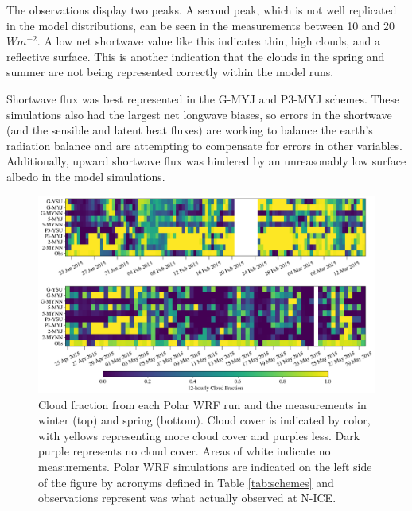 The observations display two peaks. A second peak, which is not well replicated in the model distributions, can be seen in the measurements between 10 and 20 $Wm^{-2}$. A low net shortwave value like this indicates thin, high clouds, and a reflective surface. This is another indication that the clouds in the spring and summer are not being represented correctly within the model runs. 

Shortwave flux was best represented in the G-MYJ and P3-MYJ schemes. These simulations also had the largest net longwave biases, so errors in the shortwave (and the sensible and latent heat fluxes) are working to balance the earth's radiation balance and are attempting to compensate for errors in other variables. Additionally, upward shortwave flux was hindered by an unreasonably low surface albedo in the model simulations.

\begin{figure}[h!]
    \centering \hspace*{-0.5cm}
    \includegraphics[width=1.1\linewidth]{figures/chapter3/WRF_Clouds.png}
    \caption[Polar WRF simulated cloud fraction.]{Cloud fraction from each Polar WRF run and the measurements in winter (top) and spring (bottom). Cloud cover is indicated by color, with yellows representing more cloud cover and purples less. Dark purple represents no cloud cover. Areas of white indicate no measurements. Polar WRF simulations are indicated on the left side of the figure by acronyms defined in Table \ref{tab:schemes} and observations represent was what actually observed at N-ICE.}
\label{fig:wrf_cloudfrac}
\end{figure}

